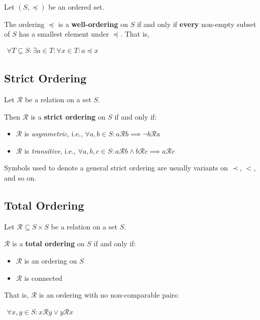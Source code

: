 Let $(S, \preceq)$ be an ordered set.

The ordering $\preceq$ is a \textbf{well-ordering} on $S$ if and only
if \textbf{every} non-empty subset of $S$ has a smallest element under
$\preceq$. That is,


\begin{math}
  \begin{array}{c}
    \forall T \subseteq S: \exists a \in T : \forall x \in T : a \preceq x
  \end{array}
\end{math}

\subsection{Strict Ordering}
\label{sec:strict-ordering}

Let $\mathcal{R}$ be a relation on a set $S$.

Then $\mathcal{R}$ is a \textbf{strict ordering} on $S$ if and only
if:

\begin{itemize}
\item $\mathcal{R}$ is \textit{asymmetric}, i.e.,
  $\forall a, b \in S : a \mathcal{R} b \implies \neg b \mathcal{R} a$
\item $\mathcal{R}$ is \textit{transitive}, i.e.,
  $\forall a, b, c \in S: a \mathcal{R} b \land b \mathcal{R} c
  \implies a \mathcal{R} c$
\end{itemize}

Symbols used to denote a general strict ordering are usually variants
on $\prec$, $<$, and so on.


\subsection{Total Ordering}

Let $\mathcal{R} \subseteq S \times S$ be a relation on a set $S$.

$\mathcal{R}$ is a \textbf{total ordering} on $S$ if and only if:

\begin{itemize}
\item $\mathcal{R}$ is an ordering on $S$
\item $\mathcal{R}$ is connected
\end{itemize}

That is, $\mathcal{R}$ is an ordering with no non-comparable pairs:


\begin{math}
  \begin{array}{c}
    \forall x, y \in S: x \mathcal{R} y \lor y \mathcal{R} x
  \end{array}
\end{math}


